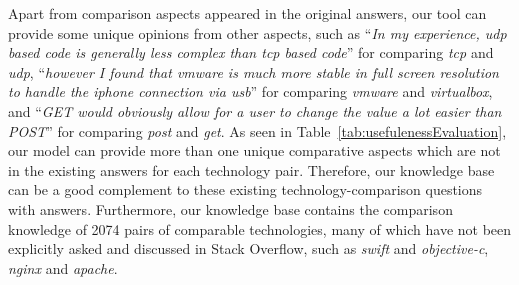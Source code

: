 Apart from comparison aspects appeared in the original answers, our tool can provide some unique opinions from other aspects, such as ``\textit{In my experience, udp based code is generally less complex than tcp based code}'' for comparing \textit{tcp} and \textit{udp}, ``\textit{however I found that vmware is much more stable in full screen resolution to handle the iphone connection via usb}'' for comparing \textit{vmware} and \textit{virtualbox}, and ``\textit{GET would obviously allow for a user to change the value a lot easier than POST}'' for comparing \textit{post} and \textit{get}.
As seen in Table~\ref{tab:usefulenessEvaluation}, our model can provide more than one unique comparative aspects which are not in the existing answers for each technology pair.
Therefore, our knowledge base can be a good complement to these existing technology-comparison questions with answers.
Furthermore, our knowledge base contains the comparison knowledge of 2074 pairs of comparable technologies, many of which have not been explicitly asked and discussed in Stack Overflow, such as \textit{swift} and \textit{objective-c}, \textit{nginx} and \textit{apache}.

